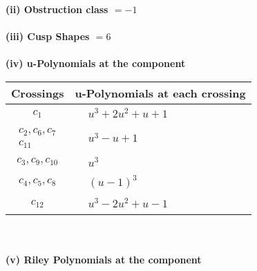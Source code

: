 \documentclass[1p]{elsarticle_modified}
\theoremstyle{definition}
\begin{document}
\flushleft \textbf{(ii) Obstruction class $= -1$}\\~\\
\flushleft \textbf{(iii) Cusp Shapes $= 6$}\\~\\
\newpage\renewcommand{\arraystretch}{1}
\flushleft \textbf{(iv) u-Polynomials at the component}\newline \\
\begin{tabular}{m{50pt}|m{274pt}}
Crossings & \hspace{64pt}u-Polynomials at each crossing \\
\hline $$\begin{aligned}c_{1}\end{aligned}$$&$\begin{aligned}
&u^3+2 u^2+u+1
\end{aligned}$\\
\hline $$\begin{aligned}c_{2},c_{6},c_{7}\\c_{11}\end{aligned}$$&$\begin{aligned}
&u^3- u+1
\end{aligned}$\\
\hline $$\begin{aligned}c_{3},c_{9},c_{10}\end{aligned}$$&$\begin{aligned}
&u^3
\end{aligned}$\\
\hline $$\begin{aligned}c_{4},c_{5},c_{8}\end{aligned}$$&$\begin{aligned}
&(u-1)^3
\end{aligned}$\\
\hline $$\begin{aligned}c_{12}\end{aligned}$$&$\begin{aligned}
&u^3-2 u^2+u-1
\end{aligned}$\\
\hline
\end{tabular}\\~\\
\newpage\renewcommand{\arraystretch}{1}
\flushleft \textbf{(v) Riley Polynomials at the component}\newline \\
\end{document}
